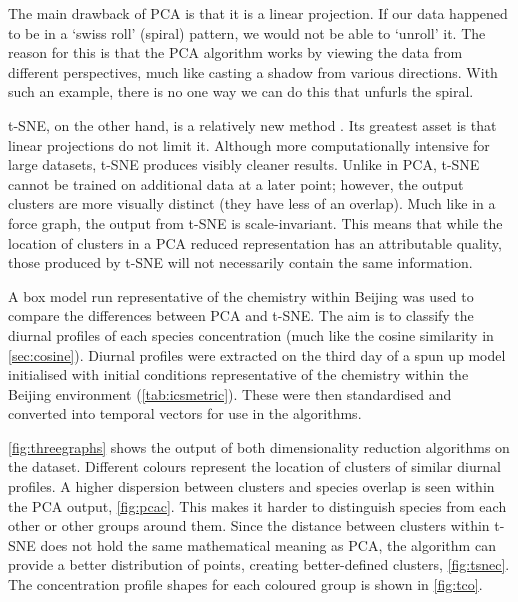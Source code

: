 The main drawback of PCA is that it is a linear projection. If our data happened to be in a `swiss roll' (spiral) pattern, we would not be able to `unroll' it. The reason for this is that the PCA algorithm works by viewing the data from different perspectives, much like casting a shadow from various directions. With such an example, there is no one way we can do this that unfurls the spiral.

t-SNE, on the other hand, is a relatively new method \citep{tsne}. Its greatest asset is that linear projections do not limit it. Although more computationally intensive for large datasets, t-SNE produces visibly cleaner results. Unlike in PCA, t-SNE cannot be trained on additional data at a later point; however, the output clusters are more visually distinct (they have less of an overlap). Much like in a force graph, the output from t-SNE is scale-invariant. This means that while the location of clusters in a PCA reduced representation has an attributable quality, those produced by t-SNE will not necessarily contain the same information.

A box model run representative of the chemistry within Beijing was used to compare the differences between PCA and t-SNE. The aim is to classify the diurnal profiles of each species concentration (much like the cosine similarity in \autoref{sec:cosine}). 
Diurnal profiles were extracted on the third day of a spun up model initialised with initial conditions representative of the chemistry within the Beijing environment (\autoref{tab:icsmetric}).
These were then standardised and converted into temporal vectors for use in the algorithms.

\autoref{fig:threegraphs} shows the output of both dimensionality reduction algorithms on the dataset. Different colours represent the location of clusters of similar diurnal profiles. A higher dispersion between clusters and species overlap is seen within the PCA output, \autoref{fig:pcac}. This makes it harder to distinguish species from each other or other groups around them.
Since the distance between clusters within t-SNE does not hold the same mathematical meaning as PCA, the algorithm can provide a better distribution of points, creating better-defined clusters, \autoref{fig:tsnec}. The concentration profile shapes for each coloured group is shown in \autoref{fig:tco}. 


